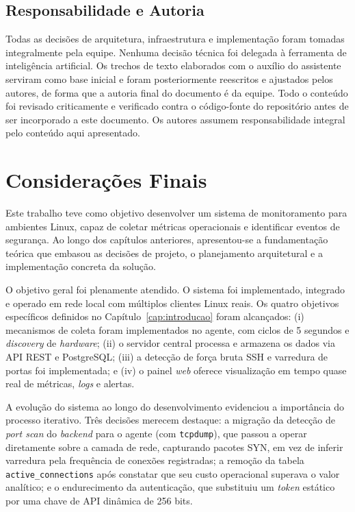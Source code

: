 \documentclass[
    12pt
    ,oneside
    ,a4paper
    ,chapter=TITLE
    ,section=TITLE
    ,sumario=abnt-6027-2012]{abntex2}
\begin{document}
\section{Responsabilidade e Autoria}
\label{sec:ia-responsabilidade}

Todas as decisões de arquitetura, infraestrutura e implementação foram tomadas
integralmente pela equipe. Nenhuma decisão técnica foi delegada à ferramenta de
inteligência artificial. Os trechos de texto elaborados com o auxílio do assistente
serviram como base inicial e foram posteriormente reescritos e ajustados pelos autores,
de forma que a autoria final do documento é da equipe. Todo o conteúdo foi revisado
criticamente e verificado contra o código-fonte do repositório antes de ser incorporado
a este documento. Os autores assumem responsabilidade integral pelo conteúdo aqui
apresentado.


\chapter{Considerações Finais}
\label{cap:conclusao}

Este trabalho teve como objetivo desenvolver um sistema de monitoramento para
ambientes Linux, capaz de coletar métricas operacionais e identificar eventos de
segurança. Ao longo dos capítulos anteriores, apresentou-se a fundamentação teórica
que embasou as decisões de projeto, o planejamento arquitetural e a implementação
concreta da solução.

O objetivo geral foi plenamente atendido. O sistema foi implementado, integrado e
operado em rede local com múltiplos clientes Linux reais. Os quatro objetivos
específicos definidos no Capítulo~\ref{cap:introducao} foram alcançados: (i)
mecanismos de coleta foram implementados no agente, com ciclos de 5 segundos e
\textit{discovery} de \textit{hardware}; (ii) o servidor central processa e armazena
os dados via API REST e PostgreSQL; (iii) a detecção de força bruta SSH e varredura
de portas foi implementada; e (iv) o painel \textit{web} oferece visualização em
tempo quase real de métricas, \textit{logs} e alertas.

A evolução do sistema ao longo do desenvolvimento evidenciou a importância do processo
iterativo. Três decisões merecem destaque: a migração da detecção de
\textit{port scan} do \textit{backend} para o agente (com \texttt{tcpdump}), que
passou a operar diretamente sobre a camada de rede, capturando pacotes SYN, em vez de
inferir varredura pela frequência de conexões registradas; a remoção da tabela \texttt{active\_connections} após constatar
que seu custo operacional superava o valor analítico; e o endurecimento da
autenticação, que substituiu um \textit{token} estático por uma chave de API dinâmica
de 256 bits.
\end{document}

